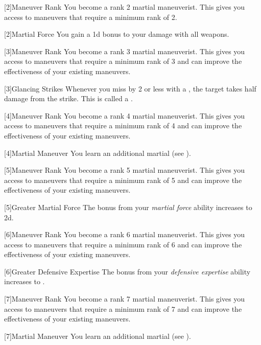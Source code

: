         {
            [2]{Maneuver Rank} You become a rank 2 martial maneuverist.
            This gives you access to maneuvers that require a minimum rank of 2.

            [2]{Martial Force} You gain a \plus1d bonus to your damage with all weapons.
        }

        {
            [3]{Maneuver Rank} You become a rank 3 martial maneuverist.
            This gives you access to maneuvers that require a minimum rank of 3 and can improve the effectiveness of your existing maneuvers.

            [3]{Glancing Strikes} Whenever you miss by 2 or less with a , the target takes half damage from the strike.
            This is called a .
        }

        {
            [4]{Maneuver Rank} You become a rank 4 martial maneuverist.
            This gives you access to maneuvers that require a minimum rank of 4 and can improve the effectiveness of your existing maneuvers.

            [4]{Martial Maneuver}
            You learn an additional martial  (see ).
        }

        {
            [5]{Maneuver Rank} You become a rank 5 martial maneuverist.
            This gives you access to maneuvers that require a minimum rank of 5 and can improve the effectiveness of your existing maneuvers.

            [5]{Greater Martial Force} The bonus from your \textit{martial force} ability increases to \plus2d.
        }

        {
            [6]{Maneuver Rank} You become a rank 6 martial maneuverist.
            This gives you access to maneuvers that require a minimum rank of 6 and can improve the effectiveness of your existing maneuvers.

            [6]{Greater Defensive Expertise} The bonus from your \textit{defensive expertise} ability increases to .
        }

        {
            [7]{Maneuver Rank} You become a rank 7 martial maneuverist.
            This gives you access to maneuvers that require a minimum rank of 7 and can improve the effectiveness of your existing maneuvers.

            [7]{Martial Maneuver}
            You learn an additional martial  (see ).
        }

